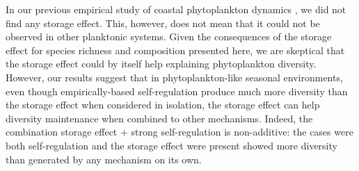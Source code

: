 \documentclass[smallcondensed,referee]{svjour3}       %
\begin{document}
In our previous empirical study of coastal phytoplankton dynamics
\citep{barraquand2018coastal}, we did not find any storage effect.
This, however, does not mean that it could not be observed in other
planktonic systems. Given the consequences of the storage effect for
species richness and composition presented here, we are skeptical
that the storage effect could by itself help explaining phytoplankton
diversity. However, our results suggest that in phytoplankton-like
seasonal environments, even though empirically-based self-regulation
produce much more diversity than the storage effect when considered
in isolation, the storage effect can help diversity maintenance when
combined to other mechanisms. Indeed, the combination storage effect
+ strong self-regulation is non-additive: the cases were both self-regulation
and the storage effect were present showed more diversity than generated
by any mechanism on its own. 
\end{document}
